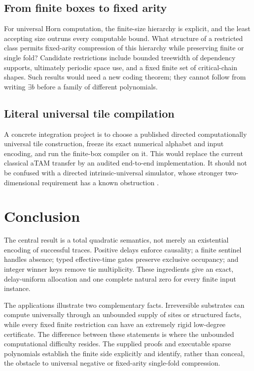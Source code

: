 \documentclass[11pt,letterpaper]{article}
\theoremstyle{definition}
\theoremstyle{remark}
\begin{document}
\subsection{From finite boxes to fixed arity}
For universal Horn computation, the finite-size hierarchy is explicit,
and the least accepting size outruns every computable bound. What
structure of a restricted class permits fixed-arity compression of this
hierarchy while preserving finite or single fold? Candidate restrictions
include bounded treewidth of dependency supports, ultimately periodic
space use, and a fixed finite set of critical-chain shapes. Such results
would need a new coding theorem; they cannot follow from writing
$\exists b$ before a family of different polynomials.

\subsection{Literal universal tile compilation}
A concrete integration project is to choose a published directed
computationally universal tile construction, freeze its exact numerical
alphabet and input encoding, and run the finite-box compiler on it.
This would replace the current classical aTAM transfer by an audited
end-to-end implementation. It should not be confused with a directed
intrinsic-universal simulator, whose stronger two-dimensional requirement
has a known obstruction \cite{ts:hendricks}.

\section{Conclusion}
The central result is a total quadratic semantics, not merely an
existential encoding of successful traces. Positive delays enforce
causality; a finite sentinel handles absence; typed effective-time gates
preserve exclusive occupancy; and integer winner keys remove tie
multiplicity. These ingredients give an exact, delay-uniform allocation
and one complete natural zero for every finite input instance.

The applications illustrate two complementary facts. Irreversible
substrates can compute universally through an unbounded supply of sites
or structured facts, while every fixed finite restriction can have an
extremely rigid low-degree certificate. The difference between these
statements is where the unbounded computational difficulty resides.
The supplied proofs and executable sparse polynomials establish the
finite side explicitly and identify, rather than conceal, the obstacle
to universal negative or fixed-arity single-fold compression.
\end{document}
